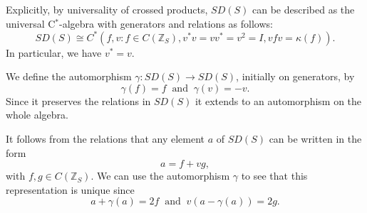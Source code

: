 \documentclass[12pt,reqno]{amsart}
\numberwithin{equation}{section}
\newcommand{\Z}{{\mathbb Z}}
\begin{document}
Explicitly, by universality of crossed products, $SD(S)$ can be described as the universal C$^*$-algebra with generators and relations as follows:
\begin{equation*}
SD(S)\cong C^*(f,v: f\in C(\Z_S), v^*v=vv^*=v^2=I, vfv=\kappa(f)).
\end{equation*}
In particular, we have $v^*=v$.

We define the automorphism $\gamma: SD(S)\to SD(S)$, initially on generators, by
\begin{equation*}
\gamma(f)=f\ \text{ and }\ \gamma(v)=-v.
\end{equation*}
Since it preserves the relations in $SD(S)$ it extends to an automorphism on the whole algebra. 

It follows from the relations that any element $a$ of $SD(S)$ can be written in the form
\begin{equation*}
a=f+vg,
\end{equation*}
with $f,g\in C(\Z_S)$. We can use the automorphism $\gamma$ to see that this representation is unique since
\begin{equation*}
a+\gamma(a)=2f\ \text{ and }\ v(a-\gamma(a))=2g.
\end{equation*}


\end{document}
